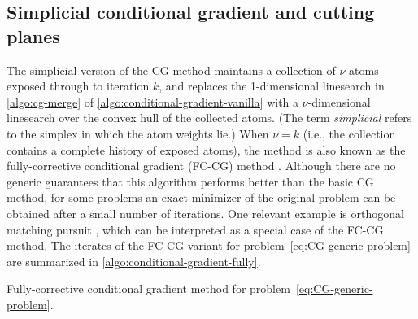 \subsection{Simplicial conditional gradient and cutting planes}

The simplicial version of the CG method maintains a collection of $\nu$ atoms
exposed through to iteration $k$, and replaces the 1-dimensional linesearch in
\autoref{algo:cg-merge} of \autoref{algo:conditional-gradient-vanilla} with a
$\nu$-dimensional linesearch over the convex hull of the collected atoms. (The
term \emph{simplicial} refers to the simplex in which the atom weights lie.)
When $\nu=k$ (i.e., the collection contains a complete history of exposed
atoms), the method is also known as the fully-corrective conditional gradient
(FC-CG) method \cite{holloway1974extension,jaggi2013revisiting}. Although there
are no generic guarantees that this algorithm performs better than the basic CG
method, for some problems an exact minimizer of the original problem can be
obtained after a small number of iterations. One relevant example is orthogonal
matching pursuit \citep{trg07}, which can be interpreted as a special case of
the FC-CG method. The iterates of the FC-CG variant for
problem~\eqref{eq:CG-generic-problem} are summarized in
\autoref{algo:conditional-gradient-fully}.


\begin{algorithm}[t]
  \DontPrintSemicolon\setcounter{AlgoLine}{-1}
    \caption{Fully-corrective conditional gradient method
    for problem~\eqref{eq:CG-generic-problem}.}
    \label{algo:conditional-gradient-fully}
\end{algorithm}

